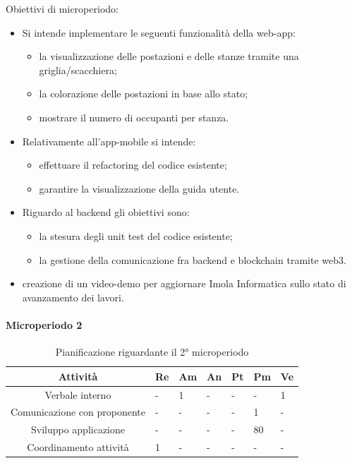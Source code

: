 Obiettivi di microperiodo:
\begin{itemize}
	\item Si intende implementare le seguenti funzionalità della web-app:
	\begin{itemize}
		\item la visualizzazione delle postazioni e delle stanze tramite una griglia/scacchiera; 
		\item la colorazione delle postazioni in base allo stato;
		\item mostrare il numero di occupanti per stanza.
	\end{itemize}
\item Relativamente all'app-mobile si intende:
\begin{itemize}
	\item effettuare il refactoring del codice esistente;
	\item garantire la visualizzazione della guida utente.
\end{itemize}
\item Riguardo al backend gli obiettivi sono:
\begin{itemize}
	\item la stesura degli unit test del codice esistente;
	\item la gestione della comunicazione fra backend e blockchain tramite web3.
\end{itemize}
\item creazione di un video-demo per aggiornare Imola Informatica sullo stato di avanzamento dei lavori.
\end{itemize}


\paragraph{Microperiodo 2}
\begin{table}[H]
	\centering
	\renewcommand{\arraystretch}{1.5}
	\begin{tabular}{|c|p{10mm}|p{10mm}|p{10mm}|p{10mm}|p{10mm}|p{10mm}|}
		\hline
		\rowcolor{lighter-grayer}
		\textbf{Attività}                         & \textbf{Re} & \textbf{Am} & \textbf{An} & \textbf{Pt} & \textbf{Pm} & \textbf{Ve} \\ \hline
		Verbale interno                                   & - & 1 & - & - & -  & 1 \\ \hline
		Comunicazione con proponente					  & - & - & - & - & 1  & - \\ \hline
		Sviluppo applicazione                             & - & - & - & - & 80 & - \\ \hline
		Coordinamento attività                            & 1 & - & - & - & -  & - \\ \hline
	\end{tabular}
	\caption{ Pianificazione riguardante il 2° microperiodo\\}
\end{table}

